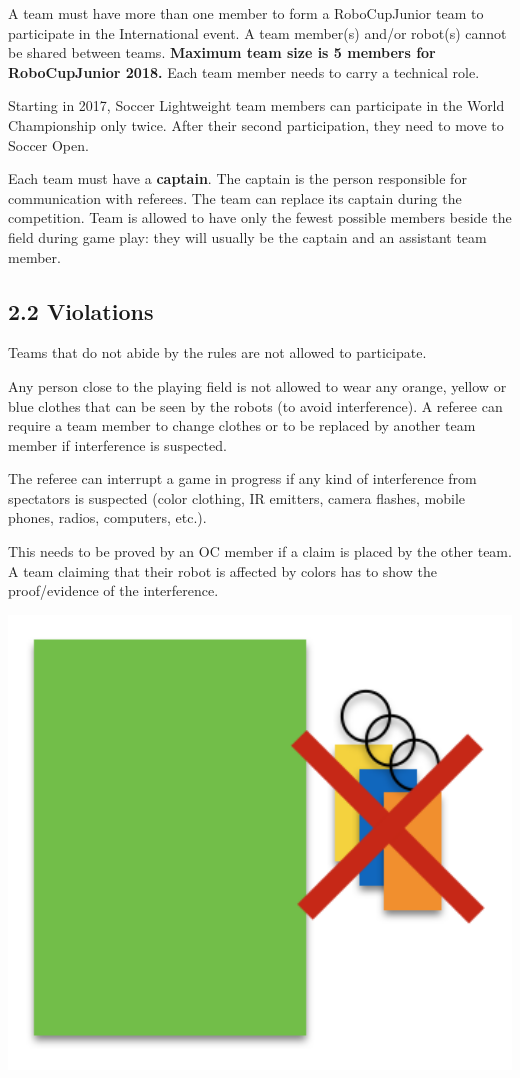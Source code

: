 \documentclass{article}
\begin{document}
A team \textcolor{color-5}{must} have more than one member to form a RoboCupJunior team to participate in the International event. A team member(s) and/or robot(s) cannot be shared between teams. \textbf{\textcolor{color-5}{Maximum team size is 5 members for RoboCupJunior 2018.}} \textcolor{color-5}{Each team member needs to carry a technical role.}

\textcolor{color-5}{Starting in 2017, Soccer Lightweight team members can participate in the World Championship only twice. After their second participation, they need to move to Soccer Open.} 

Each team must have a \textbf{captain}. The captain is the person responsible for communication with referees. The team can replace its captain during the competition. Team is allowed to have only the fewest possible members beside the field during game play: they will usually be the captain and an assistant team member.

\subsection{2.2 Violations \label{ref-017}}

Teams that do not abide by the rules are not allowed to participate.

 

Any person close to the playing field is not allowed to wear any orange, yellow or blue clothes that can be seen by the robots (to avoid interference). A referee can require a team member to change clothes or to be replaced by another team member if interference is suspected. 

The referee can interrupt a game in progress if any kind of interference from spectators is suspected (color clothing, IR emitters, camera flashes, mobile phones, radios, computers, etc.).

This needs to be proved by an OC member if a claim is placed by the other team. A team claiming that their robot is affected by colors has to show the proof/evidence of the interference.

\includegraphics[width=1\textwidth]{media/image2.png}
\end{document}
